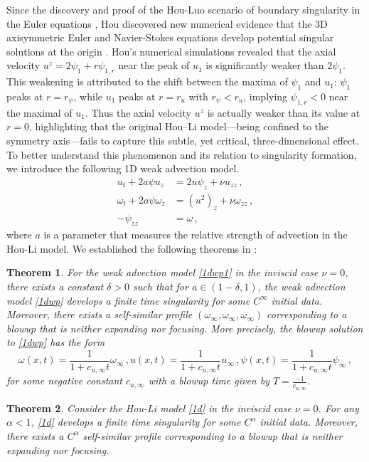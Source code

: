 \documentclass[12pt]{caltech_thesis}
\newtheorem{theorem}{Theorem}[section]
\numberwithin{equation}{section}
\begin{document}
Since the discovery and proof of the Hou-Luo scenario of boundary singularity in the Euler equations \cite{luo2013potentially-2,luo2014potentially,chen2022stable}, Hou discovered new numerical evidence that the 3D axisymmetric Euler and Navier-Stokes equations develop potential singular solutions at the origin \cite{hou2022potential, hou2022potentially}. Hou’s numerical simulations revealed that the axial velocity  $u^{z}=2 \psi_{1}+r \psi_{1, r}$ near the peak of $u_1$ is significantly weaker than $2\psi_1$. This weakening is attributed to the shift between the maxima of  $\psi_1$ and $u_1$: $\psi_1$ peaks at $r=r_\psi$, while $u_1$ peaks at $r=r_u$ with $r_\psi < r_u$, implying $\psi_{1, r}<0$ near the maximal of $u_1$. Thus the axial velocity $u^z$ is actually weaker than  its value at ${r=0}$, highlighting that the original Hou–Li model—being confined to the symmetry axis—fails to capture this subtle, yet critical, three-dimensional effect. To better understand this phenomenon and its relation to singularity formation, we introduce the following 1D weak advection model.
\begin{equation}
\label{1dwp1}
\begin{aligned}
u_{ t}+2 a\psi u_{ z} &=2 u \psi_{ z}+\nu u_{zz}\,, \\
\omega_{ t}+2 a\psi\omega_{ z} &=\left(u^{2}\right)_{z}+\nu \omega_{zz}\,, \\
- \psi_{zz} &=\omega\,,
\end{aligned}
\end{equation}
where $a$ is a parameter that measures the relative strength of advection in the Hou-Li model. We established the following theorems in \cite{hou2024blowup}:
\begin{theorem}
For the weak advection model \eqref{1dwp1} in the inviscid case $\nu=0$, there exists a constant $\delta>0$ such that for $a\in(1-\delta,1)$, the weak advection model \eqref{1dwp} develops a finite time singularity for some $C^{\infty}$ initial data. Moreover, there exists a self-similar profile $({\omega}_{\infty},{\omega}_{\infty},{\omega}_{\infty})$ corresponding to a blowup that is neither expanding nor focusing. More precisely, the blowup solution to \eqref{1dwp} has the form
$$\omega(x,t)=\frac{1}{1+c_{u,\infty}t}{\omega}_{\infty}\,,u(x,t)=\frac{1}{1+c_{u,\infty}t}u_{\infty}\,,\psi(x,t)=\frac{1}{1+c_{u,\infty}t}{\psi}_{\infty}\,,$$
for some negative constant $c_{u,\infty}$ with a blowup time given by $T= \frac{-1}{c_{u,\infty}}$.
\end{theorem}
\begin{theorem}
Consider the Hou-Li model \eqref{1d} in the inviscid case $\nu=0$. For any $\alpha<1$, \eqref{1d} develops a finite time singularity for some $C^{\alpha}$ initial data. Moreover, there exists a $C^{\alpha}$ self-similar profile corresponding to a blowup that is neither expanding nor focusing.
\end{theorem}
\end{document}
